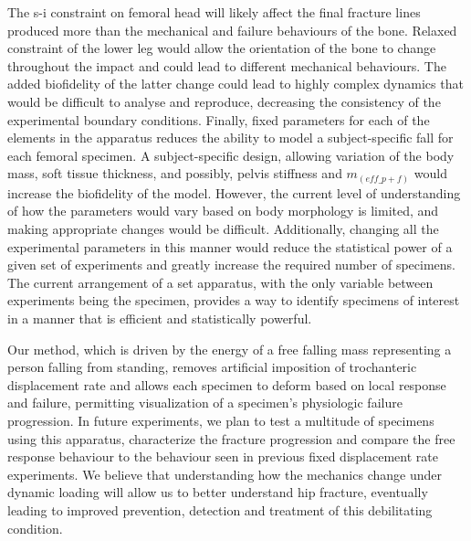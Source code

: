 The \ac{s-i} constraint on femoral head will likely affect the final fracture lines produced more than the mechanical and failure behaviours of the bone.
Relaxed constraint of the lower leg would allow the orientation of the bone to change throughout the impact and could lead to different mechanical behaviours.
The added biofidelity of the latter change could lead to highly complex dynamics that would be difficult to analyse and reproduce, decreasing the consistency of the experimental boundary conditions.
Finally, fixed parameters for each of the elements in the apparatus reduces the ability to model a subject-specific fall for each femoral specimen.
A subject-specific design, allowing variation of the body mass, soft tissue thickness, and possibly, pelvis stiffness and $m_{(eff\_p+f)}$ would increase the biofidelity of the model.
However, the current level of understanding of how the parameters would vary based on body morphology is limited, and making appropriate changes would be difficult.
Additionally, changing all the experimental parameters in this manner would reduce the statistical power of a given set of experiments and greatly increase the required number of specimens.
The current arrangement of a set apparatus, with the only variable between experiments being the specimen, provides a way to identify specimens of interest in a manner that is efficient and statistically powerful.

Our method, which is driven by the energy of a free falling mass representing a person falling from standing, removes artificial imposition of trochanteric displacement rate and allows each specimen to deform based on local response and failure, permitting visualization of a specimen's physiologic failure progression.
In future experiments, we plan to test a multitude of specimens using this apparatus, characterize the fracture progression and compare the free response behaviour to the behaviour seen in previous fixed displacement rate experiments.
We believe that understanding how the mechanics change under dynamic loading will allow us to better understand hip fracture, eventually leading to improved prevention, detection and treatment of this debilitating condition.

